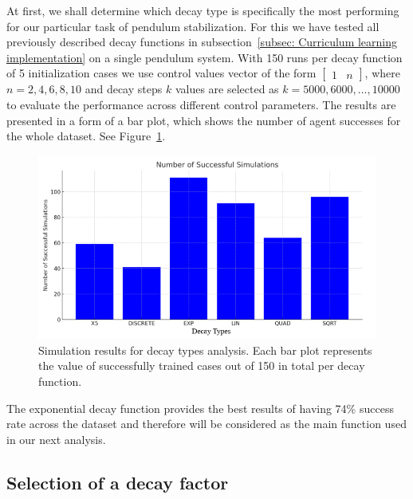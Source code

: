 At first, we shall determine which decay type is specifically the most performing for our particular task of pendulum stabilization. For this we have tested all previously described decay functions in subsection~\ref{subsec: Curriculum learning implementation} on a single pendulum system. With 150 runs per decay function of 5 initialization cases we use control values vector of the form 
\(\begin{bmatrix} 1 & n \end{bmatrix}\), where \(n = 2, 4, 6, 8, 10\) and decay steps $k$ values are selected as \(k = 5000, 6000, \ldots, 10000\) to evaluate the performance across different control parameters. The results are presented in a form of a bar plot, which shows the number of agent successes for the whole dataset. See Figure~\ref{fig: decay types comparison}.  

\begin{figure}[h]
	\centering
	\includegraphics[width=12cm]{Figures/decay_types_results_comparison.png}
	\caption{Simulation results for decay types analysis. Each bar plot represents the value of successfully trained cases out of 150 in total per decay function.}
	\label{fig: decay types comparison}
\end{figure}

The exponential decay function provides the best results of having 74\% success rate across the dataset and therefore will be considered as the main function used in our next analysis. 

\subsection{Selection of a decay factor} 


